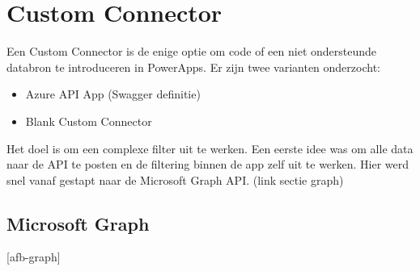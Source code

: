 \section{Custom Connector}
\label{sec:custom-connector}

Een Custom Connector is de enige optie om code of een niet ondersteunde databron te introduceren in PowerApps. Er zijn twee varianten onderzocht:
\begin{itemize}
    \item Azure API App (Swagger definitie)
    \item Blank Custom Connector
\end{itemize}
Het doel is om een complexe filter uit te werken. Een eerste idee was om alle data naar de API te posten en de filtering binnen de app zelf uit te werken. Hier werd snel vanaf gestapt naar de Microsoft Graph API. (link sectie graph)


\subsection{Microsoft Graph}

[afb-graph]


